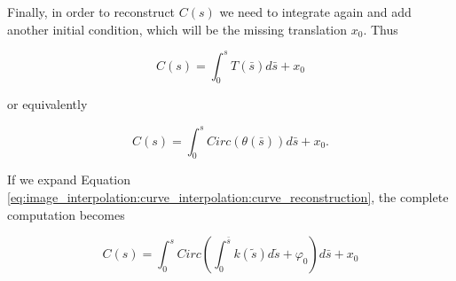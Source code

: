\documentclass{ipol}
\begin{document}
Finally, in order to reconstruct $C(s)$ we need to integrate again and add another initial condition, which will be the missing translation $x_0$. Thus 

\begin{equation}
C(s)=\int_0^s T(\bar{s} ) d\bar{s} +x_0
 \label{eq:image_interpolation:curve_interpolation:curve_reconstruction}
\end{equation}

or equivalently

\begin{equation}
C(s)=\int_0^s Circ(\theta(\bar{s}) ) d\bar{s} +x_0 .
\label{eq:image_interpolation:curve_interpolation:curve_reconstruction_from_angle}
\end{equation}

If we expand Equation \ref{eq:image_interpolation:curve_interpolation:curve_reconstruction}, the complete computation becomes

\begin{equation}
C(s)=\int_0^s Circ\left(\int_0^{\bar{s}}  k(\tilde{s})d\tilde{s}+\varphi_0 \right) d\bar{s}  +x_0
\label{eq:image_interpolation:curve_interpolation:curve_reconstruction_complete}
\end{equation}
\end{document}
